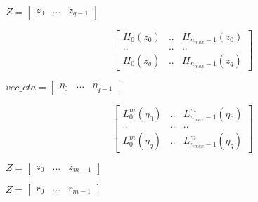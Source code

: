 \documentclass{article}
\begin{document}
$Z=\begin{bmatrix} z_0 & ... & z_{q-1} \end{bmatrix}$
\pagebreak

\[
 \begin{bmatrix}
 H_0(z_0) & .. & H_{n_{max}-1}(z_0) \\
 .. & .. & .. \\
 H_0(z_q) & .. & H_{n_{max}-1}(z_q)
 \end{bmatrix}
 \]
\pagebreak

$vec\_eta=\begin{bmatrix} \eta_0 & ... & \eta_{q-1} \end{bmatrix}$
\pagebreak

\[
 \begin{bmatrix}
 L_0^m(\eta_0) & .. & L_{n_{max}-1}^m(\eta_0) \\
 .. & .. & .. \\
 L_0^m(\eta_q) & .. & L_{n_{max}-1}^m(\eta_q)
 \end{bmatrix}
 \]
\pagebreak

$Z=\begin{bmatrix} z_0 & ... & z_{m-1} \end{bmatrix}$
\pagebreak

$Z=\begin{bmatrix} r_0 & ... & r_{m-1} \end{bmatrix}$
\pagebreak
\end{document}
